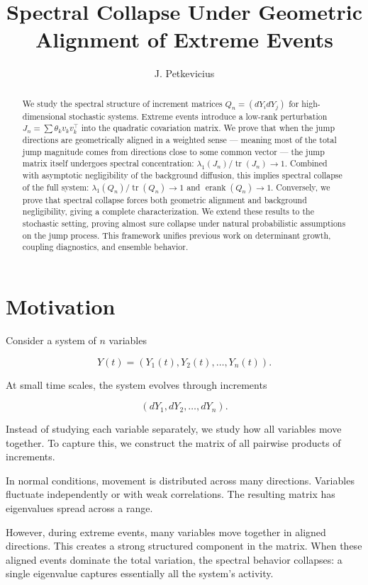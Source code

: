 \documentclass{article}
\title{Spectral Collapse Under Geometric Alignment of Extreme Events}
\author{J. Petkevicius}
\date{}
\begin{document}
\maketitle

\begin{abstract}
We study the spectral structure of increment matrices \(Q_n = (dY_i dY_j)\) for high-dimensional stochastic systems. Extreme events introduce a low-rank perturbation \(J_n = \sum \theta_k v_k v_k^\top\) into the quadratic covariation matrix. We prove that when the jump directions are geometrically aligned in a weighted sense — meaning most of the total jump magnitude comes from directions close to some common vector — the jump matrix itself undergoes spectral concentration: \(\lambda_1(J_n)/\operatorname{tr}(J_n) \to 1\). Combined with asymptotic negligibility of the background diffusion, this implies spectral collapse of the full system: \(\lambda_1(Q_n)/\operatorname{tr}(Q_n) \to 1\) and \(\operatorname{erank}(Q_n) \to 1\). Conversely, we prove that spectral collapse forces both geometric alignment and background negligibility, giving a complete characterization. We extend these results to the stochastic setting, proving almost sure collapse under natural probabilistic assumptions on the jump process. This framework unifies previous work on determinant growth, coupling diagnostics, and ensemble behavior.
\end{abstract}

\section{Motivation}

Consider a system of \(n\) variables

\[
Y(t) = (Y_1(t), Y_2(t), \dots, Y_n(t)).
\]

At small time scales, the system evolves through increments

\[
(dY_1, dY_2, \dots, dY_n).
\]

Instead of studying each variable separately, we study how all variables move together. To capture this, we construct the matrix of all pairwise products of increments.

In normal conditions, movement is distributed across many directions. Variables fluctuate independently or with weak correlations. The resulting matrix has eigenvalues spread across a range.

However, during extreme events, many variables move together in aligned directions. This creates a strong structured component in the matrix. When these aligned events dominate the total variation, the spectral behavior collapses: a single eigenvalue captures essentially all the system's activity.
\end{document}
